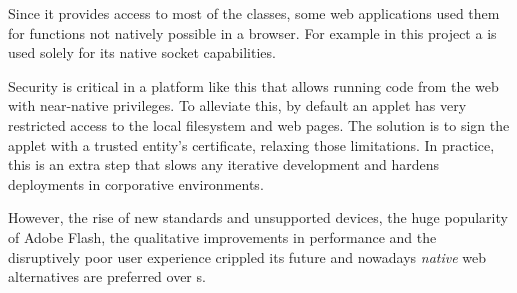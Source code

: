Since it provides access to most of the  classes, some web applications used them for functions not natively possible in a browser.
For example in this project a  is used solely for its native socket capabilities.

Security is critical in a platform like this that allows running code from the web with near-native privileges.
To alleviate this, by default an applet has very restricted access to the local filesystem and web pages.
The solution is to sign the applet with a trusted entity's certificate, relaxing those limitations.
In practice, this is an extra step that slows any iterative development and hardens deployments in corporative environments.

However, the rise of new standards and unsupported devices, the huge popularity of Adobe Flash, the qualitative improvements in  performance and the disruptively poor user experience crippled its future and nowadays \emph{native} web alternatives are preferred over s.


